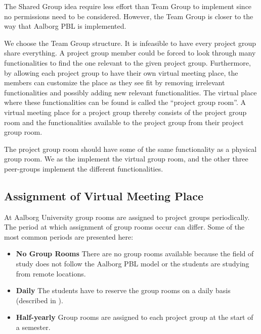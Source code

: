 The Shared Group idea require less effort than Team Group to implement since no permissions need to be considered.
However, the Team Group is closer to the way that Aalborg PBL is implemented.

We choose the Team Group structure. 
It is infeasible to have every project group share everything.
A project group member could be forced to look through many functionalities to find the one relevant to the given project group.
Furthermore, by allowing each project group to have their own virtual meeting place, the members can customize the place as they see fit by removing irrelevant functionalities and possibly adding new relevant functionalities.
The virtual place where these functionalities can be found is called the ``project group room''.
A virtual meeting place for a project group thereby consists of the project group room and the functionalities available to the project group from their project group room.

The project group room should have some of the same functionality as a physical group room.
We as the \administrationgroup{} implement the virtual group room, and the other three peer-groups implement the different functionalities.


\subsection{Assignment of Virtual Meeting Place}
At Aalborg University group rooms are assigned to project groups periodically.
The period at which assignment of group rooms occur can differ.
Some of the most common periods are presented here:
\begin{itemize}
	\item \textbf{No Group Rooms} There are no group rooms available because the field of study does not follow the Aalborg PBL model or the students are studying from remote locations.
	\item \textbf{Daily} The students have to reserve the group rooms on a daily basis (described in ).
	\item \textbf{Half-yearly} Group rooms are assigned to each project group at the start of a semester.
\end{itemize} 

